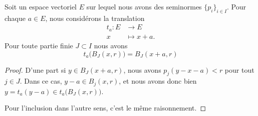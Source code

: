 \begin{lemma}		\label{LEMooCNRNooWCejjZ}
	Soit un espace vectoriel \( E\) sur lequel nous avons des seminormes \( \{ p_i \}_{i\in I}\). Pour chaque \( a\in E\), nous considérons la translation
	\begin{equation}
		\begin{aligned}
			t_a\colon E & \to E        \\
			x           & \mapsto x+a.
		\end{aligned}
	\end{equation}
	Pour toute partie finie \( J\subset I\) nous avons
	\begin{equation}
		t_a\big( B_J(x,r) \big)=B_J(x+a,r)
	\end{equation}
\end{lemma}

\begin{proof}
	D'une part si \( y\in B_J(x+a,r)\), nous avons \( p_j(y-x-a)<r\) pour tout \( j\in J\). Dans ce cas, \( y-a\in B_j(x,r)\), et nous avons donc bien \( y=t_a(y-a)\in t_a\big( B_J(x,r) \big)\).

	Pour l'inclusion dans l'autre sens, c'est le même raisonnement.
\end{proof}

